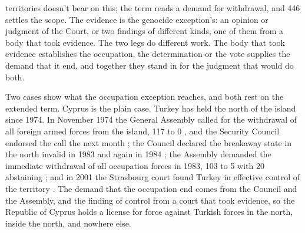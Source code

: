 territories doesn't bear on this; the term reads a demand for withdrawal, and 446 settles the scope. The evidence is the genocide exception's: an opinion or judgment of the Court, or two findings of different kinds, one of them from a body that took evidence. The two legs do different work. The body that took evidence establishes the occupation, the determination or the vote supplies the demand that it end, and together they stand in for the judgment that would do both.

Two cases show what the occupation exception reaches, and both rest on the extended term. Cyprus is the plain case. Turkey has held the north of the island since 1974. In November 1974 the General Assembly called for the withdrawal of all foreign armed forces from the island, 117 to 0 \autocite{unga1974res3212}, and the Security Council endorsed the call the next month \autocite{unsc1974res365}; the Council declared the breakaway state in the north invalid in 1983 and again in 1984 \autocite{unsc1983res541,unsc1984res550}; the Assembly demanded the immediate withdrawal of all occupation forces in 1983, 103 to 5 with 20 abstaining \autocite{unga1983res37253}; and in 2001 the Strasbourg court found Turkey in effective control of the territory \autocite{ecthr2001cyprus}. The demand that the occupation end comes from the Council and the Assembly, and the finding of control from a court that took evidence, so the Republic of Cyprus holds a license for force against Turkish forces in the north, inside the north, and nowhere else.

